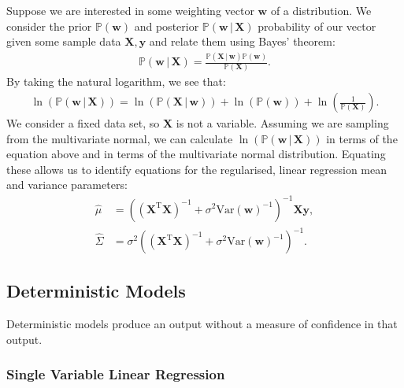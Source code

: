 Suppose we are interested in some weighting vector $\mathbf{w}$ of 
a distribution. We consider the prior $\mathbb{P}(\mathbf{w})$
and posterior $\mathbb{P}(\mathbf{w} \, | \, \textbf{X})$ probability
of our vector given some sample data $\mathbf{X}, \mathbf{y}$ and 
relate them using Bayes' theorem: \begin{gather*}
    \mathbb{P}(\mathbf{w} \, | \, \mathbf{X})
    = \frac{
        \mathbb{P}(\mathbf{X} \, | \, \mathbf{w})\mathbb{P}(\mathbf{w})
    }{\mathbb{P}(\mathbf{X})}.
\end{gather*} By taking the natural logarithm, we see that:
\begin{gather*}
    \ln(\mathbb{P}(\mathbf{w} \, | \, \mathbf{X}))
    = \ln(\mathbb{P}(\mathbf{X} \, | \, \mathbf{w}))
    + \ln(\mathbb{P}(\mathbf{w}))
    + \ln\left(\frac{1}{\mathbb{P}(\mathbf{X})}\right).
\end{gather*} We consider a fixed data set, so $\mathbf{X}$ is not
a variable. Assuming we are sampling from the multivariate normal,
we can calculate 
$\ln(\mathbb{P}(\mathbf{w} \, | \, \mathbf{X}))$ in terms of
the equation above and in terms of the multivariate normal
distribution. Equating these allows us to identify equations
for the regularised, linear regression mean and variance parameters:
\begin{align*}
    \hat\mu &= ((\mathbf{X}^{\text{T}}\mathbf{X})^{-1}
    + \sigma^2 \text{Var}(\mathbf{w})^{-1})^{-1}\mathbf{X}\mathbf{y}, \\
    \hat\Sigma &= \sigma^2 ((\mathbf{X}^{\text{T}}\mathbf{X})^{-1}
    + \sigma^2 \text{Var}(\mathbf{w})^{-1})^{-1}.
\end{align*} 

\subsection{Deterministic Models}

Deterministic models produce an output without a measure of
confidence in that output.

\subsubsection{Single Variable Linear Regression}


